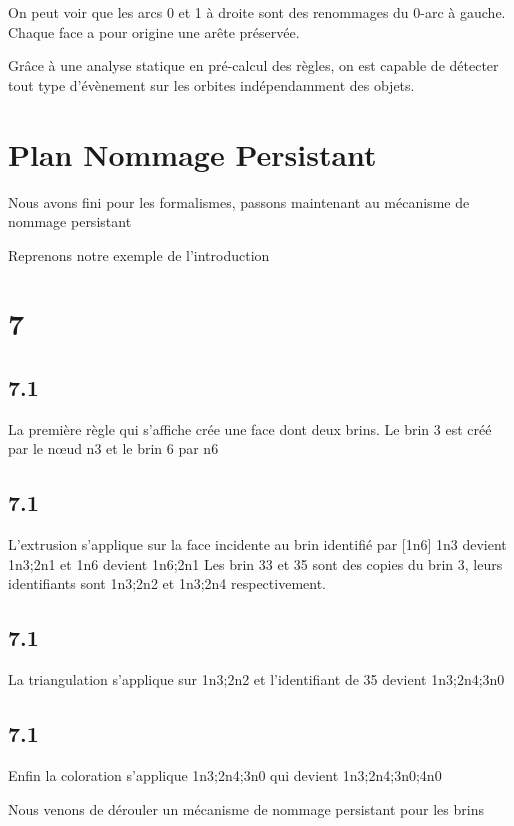 \documentclass[11pt]{article}
\begin{document}
On peut voir que les arcs 0 et 1 à droite sont des renommages du 0-arc à gauche.
Chaque face a pour origine une arête préservée.

Grâce à une analyse statique en pré-calcul des règles, on est capable de
détecter tout type d'évènement sur les orbites indépendamment des objets.
\section{Plan Nommage Persistant}
\label{sec:org029115b}
Nous avons fini pour les formalismes, passons maintenant au mécanisme de nommage persistant

Reprenons notre exemple de l'introduction
\section{7}
\label{sec:org998b3b3}
\subsection{7.1}
\label{sec:orgaed6bcd}
La première règle qui s'affiche crée une face dont deux brins.
Le brin 3 est créé par le nœud n3 et le brin 6 par n6
\subsection{7.1}
\label{sec:org2b32af4}
L'extrusion s'applique sur la face incidente au brin identifié par [1n6] 1n3
devient 1n3;2n1 et 1n6 devient 1n6;2n1
Les brin 33 et 35 sont des copies du brin 3, leurs identifiants sont 1n3;2n2 et 1n3;2n4 respectivement.
\subsection{7.1}
\label{sec:org0e4995a}
La triangulation s'applique sur 1n3;2n2 et l'identifiant de 35 devient 1n3;2n4;3n0
\subsection{7.1}
\label{sec:orgb76a52a}
Enfin la coloration s'applique 1n3;2n4;3n0 qui devient 1n3;2n4;3n0;4n0

Nous venons de dérouler un mécanisme de nommage persistant pour les brins
\end{document}
